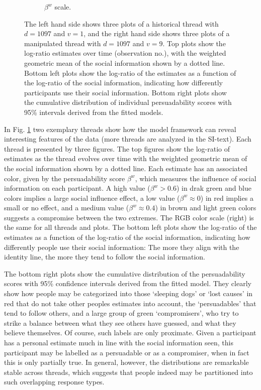 \documentclass[9pt,a4paper,twocolumn,lineno]{article}
\begin{document}
\begin{figure}[!h]
\begin{subfigure}{.1\linewidth}
		\caption{\footnotesize $\beta^w$ scale.}
	\end{subfigure}
	\caption{\footnotesize The left hand side shows three plots of a historical thread with $d=1097$ and $v=1$, and the right hand side shows three plots of a manipulated thread with $d=1097$ and $v=9$. Top plots show the log-ratio estimates over time (observation no.), with the weighted geometric mean of the social information shown by a dotted line. Bottom left plots show the log-ratio of the estimates as a function of the log-ratio of the social information, indicating how differently participants use their social information. Bottom right plots show the cumulative distribution of individual persuadability scores with 95\% intervals derived from the fitted models.}
\label{fig: social influence}
\end{figure}

In Fig. \ref{fig: social influence} two exemplary threads show how the model framework can reveal interesting features of the data (more threads are analyzed in the SI-text). Each thread is presented by three figures. The top figures show the log-ratio of estimates as the thread evolves over time with the weighted geometric mean of the social information shown by a dotted line. Each estimate has an associated color, given by the persuadability score $\beta^w$, which measures the influence of social information on each participant. A high value ($\beta^w>0.6$) in drak green and blue colors implies a large social influence effect, a low value ($\beta^w\approx 0$) in red implies a small or no effect, and a medium value ($\beta^w \approx 0.4$) in brown and light green colors suggests a compromise between the two extremes. The RGB color scale (right) is the same for all threads and plots. The bottom left plots show the log-ratio of the estimates as a function of the log-ratio of the social information, indicating how differently people use their social information: The more they align with the identity line, the more they tend to follow the social information. 

The bottom right plots show the cumulative distribution of the persuadability scores with 95\% confidence intervals derived from the fitted model. They clearly show how people may be categorized into those ‘sleeping dogs’ or ‘lost causes’ \cite{devriendt2018literature} in red that do not take other peoples estimates into account, the `persuadables' that tend to follow others, and a large group of green `compromisers', who try to strike a balance between what they see others have guessed, and what they believe themselves. Of course, such labels are only proximate. Given a participant has a personal estimate much in line with the social information seen, this participant may be labelled as a persuadable or as a compromiser, when in fact this is only partially true. In general, however, the distributions are remarkable stable across threads, which suggests that people indeed may be partitioned into such overlapping response types.
\end{document}
